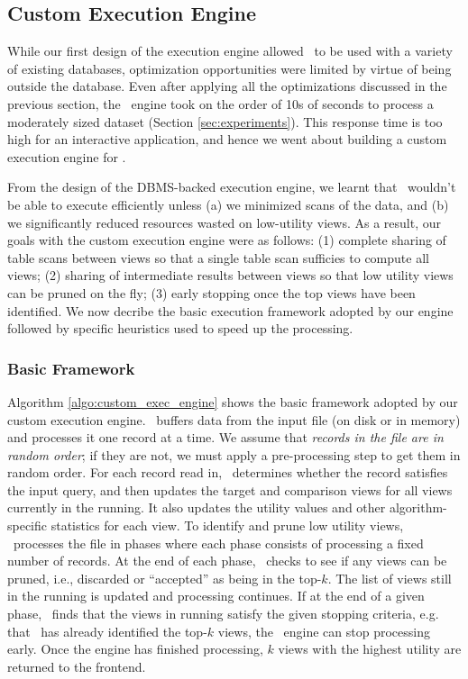 \subsection{Custom Execution Engine}
\label{sec:in_memory_execution_engine}

While our first design of the execution engine allowed \VizRecDB\ to be
used with a variety of existing databases, optimization opportunities were
limited by virtue of being outside the database.
Even after applying all the optimizations discussed in the previous section, the
\VizRecDB\ engine took on the order of 10s of seconds to process a
moderately sized dataset (Section \ref{sec:experiments}).
This response time is too high for an interactive application, and hence we
went about building a custom execution engine for \VizRecDB.

From the design of the DBMS-backed execution engine, we learnt that \VizRecDB\
wouldn't be able to execute efficiently unless (a) we minimized scans of the
data, and (b) we significantly reduced resources wasted on low-utility views.
As a result, our goals with the custom execution engine were as follows:
(1) complete sharing of table scans between views so that a single table scan
sufficies to compute all views; 
(2) sharing of intermediate results between views so that low utility views can
be pruned on the fly; 
(3) early stopping once the top views have been identified. 
We now decribe the
basic execution framework adopted by our engine followed by specific heuristics
used to speed up the processing.

\subsubsection{Basic Framework}
\label{subsec:basic_framework}
Algorithm \ref{algo:custom_exec_engine} shows the basic framework adopted by our
custom execution engine.
\VizRecDB\ buffers data from the input file (on disk or in memory) and processes it
one record at a time.
We assume that {\it records in the file are in random order}; if they are not,
we must apply a pre-processing step to get them in random order.
For each record read in, \VizRecDB\ determines whether the record satisfies the
input query, and then updates the target and comparison views for all views
currently in the running.
It also updates the utility values and other algorithm-specific statistics for
each view.
To identify and prune low utility views, \VizRecDB\ processes the file in
phases where each phase consists of processing a fixed number of records.
At the end of each phase, \VizRecDB\ checks to see if any views can be pruned,
i.e., discarded or ``accepted'' as being in the top-$k$.
The list of views still in the running is updated and processing continues.
If at the end of a given phase, \VizRecDB\ finds that the views in running satisfy
the given stopping criteria, e.g. that \VizRecDB\ has already identified the
top-$k$ views, the \VizRecDB\ engine can stop processing early.
Once the engine has finished processing, $k$ views with the
highest utility are returned to the frontend.

